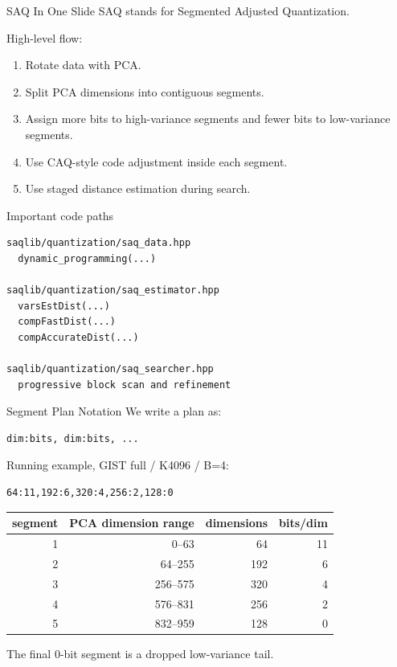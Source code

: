 \documentclass[aspectratio=169,10pt]{beamer}
\begin{document}
\begin{frame}[fragile]{SAQ In One Slide}
\small
SAQ stands for Segmented Adjusted Quantization.

\vspace{0.5em}
High-level flow:
\begin{enumerate}
  \item Rotate data with PCA.
  \item Split PCA dimensions into contiguous segments.
  \item Assign more bits to high-variance segments and fewer bits to low-variance segments.
  \item Use CAQ-style code adjustment inside each segment.
  \item Use staged distance estimation during search.
\end{enumerate}

\vspace{0.6em}
\begin{block}{Important code paths}
\begin{lstlisting}
saqlib/quantization/saq_data.hpp
  dynamic_programming(...)

saqlib/quantization/saq_estimator.hpp
  varsEstDist(...)
  compFastDist(...)
  compAccurateDist(...)

saqlib/quantization/saq_searcher.hpp
  progressive block scan and refinement
\end{lstlisting}
\end{block}
\end{frame}

\begin{frame}[fragile]{Segment Plan Notation}
\small
We write a plan as:
\begin{lstlisting}
dim:bits, dim:bits, ...
\end{lstlisting}

Running example, GIST full / K4096 / B=4:
\begin{lstlisting}
64:11,192:6,320:4,256:2,128:0
\end{lstlisting}

\vspace{0.5em}
\scriptsize
\begin{tabular}{rrrr}
\toprule
segment & PCA dimension range & dimensions & bits/dim \\
\midrule
1 & 0--63 & 64 & 11 \\
2 & 64--255 & 192 & 6 \\
3 & 256--575 & 320 & 4 \\
4 & 576--831 & 256 & 2 \\
5 & 832--959 & 128 & 0 \\
\bottomrule
\end{tabular}

\vspace{0.6em}
\small
The final 0-bit segment is a dropped low-variance tail.
\end{frame}
\end{document}
